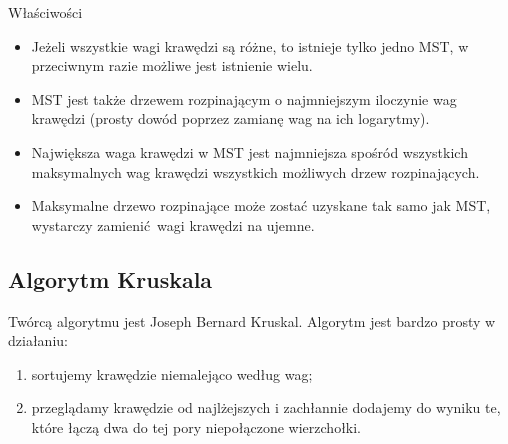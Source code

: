 \documentclass[../main.tex]{subfiles}
\begin{document}
\begin{frame}{\subsecname}{Właściwości}

\begin{itemize}
  \pause\item
    Jeżeli wszystkie wagi krawędzi są różne, to istnieje tylko jedno MST, w przeciwnym razie
    możliwe jest istnienie wielu.
  \pause\item
    MST jest także drzewem rozpinającym o najmniejszym iloczynie wag krawędzi
    (prosty dowód poprzez zamianę wag na ich logarytmy).
  \pause\item
    Największa waga krawędzi w MST jest najmniejsza spośród wszystkich maksymalnych wag
    krawędzi wszystkich możliwych drzew rozpinających.
  \pause\item
    Maksymalne drzewo rozpinające może zostać uzyskane tak samo jak MST, wystarczy 
    zamienić wagi krawędzi na ujemne.
\end{itemize}

\end{frame}

\subsection{Algorytm Kruskala}

\begin{frame}{\subsecname}

Twórcą algorytmu jest Joseph Bernard Kruskal. Algorytm jest bardzo prosty w działaniu:
\begin{enumerate}
  \pause\item sortujemy krawędzie niemalejąco według wag;
  \pause\item przeglądamy krawędzie od najlżejszych i zachłannie dodajemy do wyniku te, które łączą dwa do tej pory niepołączone wierzchołki.
\end{enumerate}

\end{frame}
\end{document}
